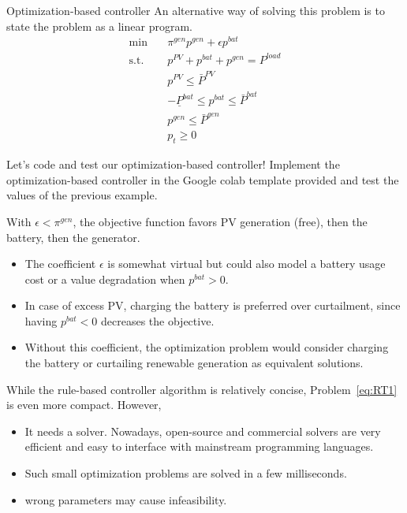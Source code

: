 \begin{frame}[allowframebreaks]{Optimization-based controller}
An alternative way of solving this problem is to state the problem as a linear program. 
\begin{subequations}
	\label{eq:RT1}
    \begin{align}
    \min        \quad  & \pi^{gen} p^{gen}  + \epsilon p^{bat}\\
    \text{s.t.} \quad  & p^{PV}+p^{bat}+p^{gen} = P^{load} \\
                    & p^{PV} \leq \bar{P}^{PV} \\
                    & -\underline{P}^{bat} \leq p^{bat} \leq \bar{P}^{bat} \\
                    & p^{gen} \leq \bar{P}^{gen}\\
                    & p_t \geq 0
    \end{align}
\end{subequations}

\begin{block}{Let's code and test our optimization-based controller! }
    Implement the optimization-based controller in the Google colab template provided and test the values of the previous example.
\end{block}    

With $\epsilon < \pi^{gen}$, the objective function favors PV generation (free), then the battery, then the generator. 

\begin{itemize}
    \item The coefficient $\epsilon$ is somewhat virtual but could also model a battery usage cost or a value degradation when $p^{bat} > 0$.
    \item In case of excess PV, charging the battery is preferred over curtailment, since having $p^{bat} < 0$ decreases the objective. 
    \item Without this coefficient, the optimization problem would consider charging the battery or curtailing renewable generation as equivalent solutions.
\end{itemize}

While the rule-based controller algorithm is relatively concise, Problem~\eqref{eq:RT1} is even more compact. 
However,
\begin{itemize}
    \item It needs a solver. Nowadays, open-source and commercial solvers are very efficient and easy to interface with mainstream programming languages. 
    \item Such small optimization problems are solved in a few milliseconds. 
    \item wrong parameters may cause infeasibility. 
\end{itemize}
\end{frame}


